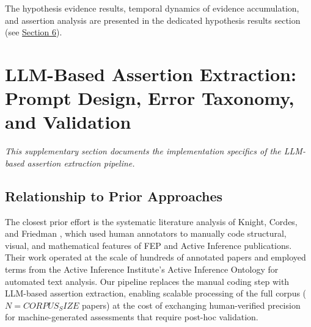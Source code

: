 \documentclass[
]{article}
\begin{document}
The hypothesis evidence results, temporal dynamics of evidence
accumulation, and assertion analysis are presented in the dedicated
hypothesis results section (see
\hyperref[sec:hypothesis_results]{Section 6}).

\newpage

\section{\texorpdfstring{LLM-Based Assertion Extraction: Prompt Design,
Error Taxonomy, and Validation
\label{sec:extraction_pipeline}}{LLM-Based Assertion Extraction: Prompt Design, Error Taxonomy, and Validation }}\label{llm-based-assertion-extraction-prompt-design-error-taxonomy-and-validation}

\emph{This supplementary section documents the implementation specifics
of the LLM-based assertion extraction pipeline.}

\subsection{Relationship to Prior
Approaches}\label{relationship-to-prior-approaches}

The closest prior effort is the systematic literature analysis of
Knight, Cordes, and Friedman \citep{knight2022fep}, which used human
annotators to manually code structural, visual, and mathematical
features of FEP and Active Inference publications. Their work operated
at the scale of hundreds of annotated papers and employed terms from the
Active Inference Institute's Active Inference Ontology for automated
text analysis. Our pipeline replaces the manual coding step with
LLM-based assertion extraction, enabling scalable processing of the full
corpus (\(N = {{CORPUS_SIZE}}\) papers) at the cost of exchanging
human-verified precision for machine-generated assessments that require
post-hoc validation.
\end{document}
